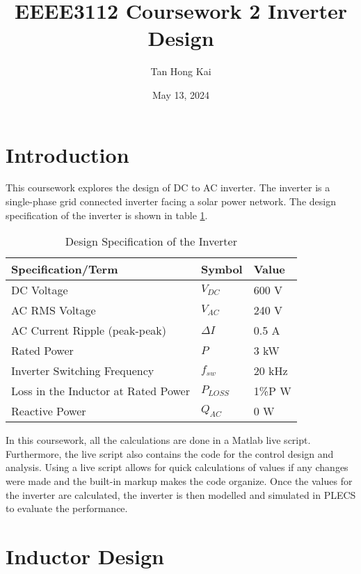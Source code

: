 \documentclass[12pt]{article}
\title{EEEE3112 Coursework 2 Inverter Design}
\author{Tan Hong Kai}
\date{May 13, 2024}
\begin{document}
\maketitle

\section{Introduction}

This coursework explores the design of DC to AC inverter.
The inverter is a single-phase grid connected inverter facing a solar power network.
The design specification of the inverter is shown in table \ref{tab:design-spec}.

\begin{table}[H]
    \caption{Design Specification of the Inverter}
    \label{tab:design-spec}
    \centering{}
    \begin{tabular}{l l  l}
        \hline
        Specification/Term                  & Symbol      & Value  \\
        \hline
        DC Voltage                          & $V_{DC}$    & 600 V  \\
        AC RMS Voltage                      & $V_{AC}$    & 240 V  \\
        AC Current Ripple (peak-peak)       & $\Delta{I}$ & 0.5 A  \\
        Rated Power                         & $P$         & 3 kW   \\
        Inverter Switching Frequency        & $f_{sw}$    & 20 kHz \\
        Loss in the Inductor at Rated Power & $P_{LOSS}$  & 1\%P W \\
        Reactive Power                      & $Q_{AC}$    & 0 W    \\
        \hline
    \end{tabular}
\end{table}

In this coursework, all the calculations are done in a Matlab live script.
Furthermore, the live script also contains the code for the control design and analysis.
Using a live script allows for quick calculations of values if any changes were made and the built-in markup makes the code organize.
Once the values for the inverter are calculated, the inverter is then modelled and simulated in PLECS to evaluate the performance.

\section{Inductor Design}
\end{document}
